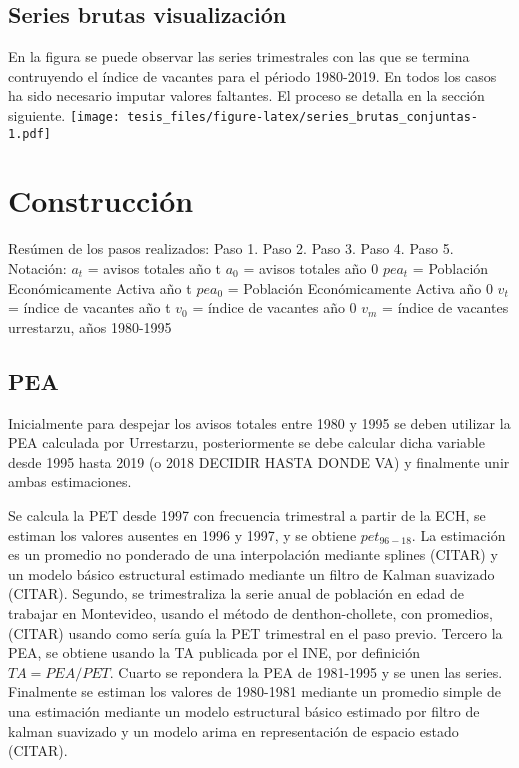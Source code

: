 \documentclass[12pt,twoside]{reedthesis}
\begin{document}
\hypertarget{series-brutas-visualizaciuxf3n}{%
\subsection{Series brutas visualización}\label{series-brutas-visualizaciuxf3n}}

En la figura se puede observar las series trimestrales con las que se termina contruyendo el índice de vacantes para el périodo 1980-2019. En todos los casos ha sido necesario imputar valores faltantes. El proceso se detalla en la sección siguiente.
\texttt{[image: tesis\_files/figure-latex/series\_brutas\_conjuntas-1.pdf]}

\hypertarget{construcciuxf3n}{%
\section{Construcción}\label{construcciuxf3n}}

Resúmen de los pasos realizados:
Paso 1.
Paso 2.
Paso 3.
Paso 4.
Paso 5.
Notación: \newline
\(a_t\) = avisos totales año t \newline
\(a_0\) = avisos totales año 0 \newline
\(pea_t\) = Población Económicamente Activa año t \newline
\(pea_0\) = Población Económicamente Activa año 0 \newline
\(v_t\) = índice de vacantes año t \newline
\(v_0\) = índice de vacantes año 0 \newline
\(v_m\) = índice de vacantes urrestarzu, años 1980-1995 \newline

\hypertarget{pea}{%
\subsection{PEA}\label{pea}}

Inicialmente para despejar los avisos totales entre 1980 y 1995 se deben utilizar la PEA calculada por Urrestarzu, posteriormente se debe calcular dicha variable desde 1995 hasta 2019 (o 2018 DECIDIR HASTA DONDE VA) y finalmente unir ambas estimaciones.

Se calcula la PET desde 1997 con frecuencia trimestral a partir de la ECH, se estiman los valores ausentes en 1996 y 1997, y se obtiene \(pet_{96-18}\). La estimación es un promedio no ponderado de una interpolación mediante splines (CITAR) y un modelo básico estructural estimado mediante un filtro de Kalman suavizado (CITAR).
Segundo, se trimestraliza la serie anual de población en edad de trabajar en Montevideo, usando el método de denthon-chollete, con promedios, (CITAR) usando como sería guía la PET trimestral en el paso previo. Tercero la PEA, se obtiene usando la TA publicada por el INE, por definición \(TA = PEA/PET\).
Cuarto se repondera la PEA de 1981-1995 y se unen las series. Finalmente se estiman los valores de 1980-1981 mediante un promedio simple de una estimación mediante un modelo estructural básico estimado por filtro de kalman suavizado y un modelo arima en representación de espacio estado (CITAR).
\end{document}
